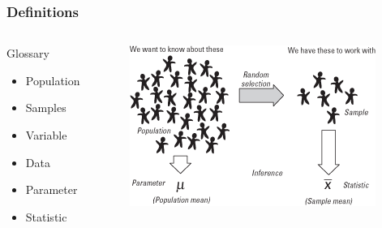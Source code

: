\documentclass[10pt, compress]{beamer}
\begin{document}
\begin{frame}
    \frametitle{Definitions}
    \begin{columns}
        \begin{block}{Glossary}
            \begin{itemize}
                \item Population
                \item Samples
                \item Variable
                \item Data
                \item Parameter
                \item Statistic
            \end{itemize}
        \end{block}
        \begin{block}{}
            \begin{figure}
                \begin{center}
                    \includegraphics[scale=0.7]{img/as1-10-popvsam.png}
                \end{center}
            \end{figure}
        \end{block}
    \end{columns}
\end{frame}
\end{document}
